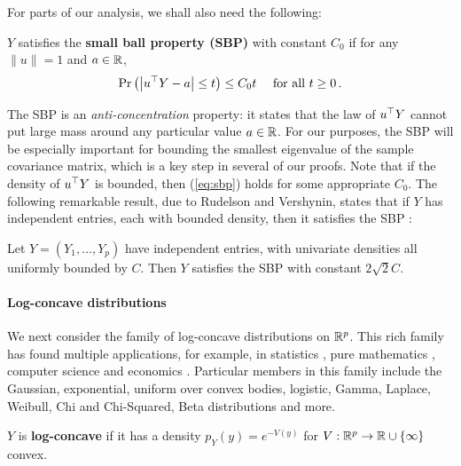 \documentclass[times,sort&compress,3p]{elsarticle}
\begin{document}
For parts of our analysis, we shall also need the following:
\begin{definition}
\label{def:small-ball}
    $Y$ satisfies the {\bf small ball property (SBP)} with constant $C_0$  if for any $\|u\|=1$ and $a\in \mathbb{R}$, 
    \begin{equation}\label{eq:sbp}
        \Pr \left( \left|u^\top Y - a\right| \le t \right) \le C_0 t \quad \textrm{ for all }t\ge 0 \,.
    \end{equation}
\end{definition}
The SBP is an \emph{anti-concentration} property: it states that the law of $u^\top Y$ cannot put 
large mass around any particular value $a\in\mathbb{R}$.
For our purposes, the SBP will be {especially important for bounding} the smallest eigenvalue of the sample covariance matrix, which is a key step in 
{several of our proofs.}
Note that if the density of $u^\top Y$ is bounded, then (\ref{eq:sbp}) holds for some appropriate $C_0$. The following remarkable result, due to Rudelson and Vershynin, states that if $Y$ has independent entries, each with bounded density, then it satisfies the SBP \cite[Theorem 1.2]{rudelson2015small}:
\begin{lemma}
    \label{lem:sbp-indep}
    Let $Y=(Y_1,\ldots,Y_p)$ have independent entries, 
    with univariate densities all uniformly bounded by $C$.
    Then $Y$ satisfies the SBP with constant $2\sqrt{2}C$.
\end{lemma}


\paragraph*{Log-concave distributions}
We next consider the family of log-concave distributions on $\mathbb{R}^p$. 
This rich family has found multiple applications, for example, in
statistics \cite{bagnoli2005log}, pure mathematics \cite{brazitikos2014geometry,stanley1989log}, computer science \cite{balcan2013active,lovasz2007geometry} and economics \cite{an1997log}. 
Particular members in this family include
the Gaussian, exponential, uniform over convex bodies, logistic, Gamma, Laplace, Weibull, Chi and Chi-Squared, Beta distributions and more.

\begin{definition}\label{def:logconcave}
        $Y$ is \textbf{log-concave} if it has a density $p_{Y}(y) = e^{-V(y)}$ 
        for $V:\mathbb{R}^p \to \mathbb{R}\cup \{\infty\}$ convex.
\end{definition}
\end{document}
